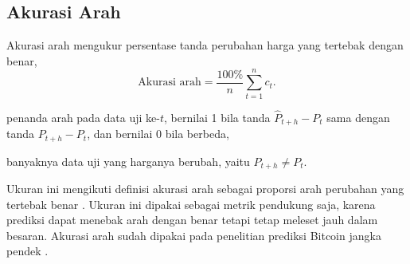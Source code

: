 \subsection{Akurasi Arah}
Akurasi arah mengukur persentase tanda perubahan harga yang tertebak dengan
benar,
\begin{equation}
  \text{Akurasi arah} = \frac{100\%}{n}\sum_{t=1}^{n} c_t .
  \label{eq:arah}
\end{equation}
\begin{keterangan}
  \item[$c_t$] penanda arah pada data uji ke-$t$, bernilai 1 bila tanda
    $\hat{P}_{t+h} - P_t$ sama dengan tanda $P_{t+h} - P_t$, dan bernilai 0
    bila berbeda,
  \item[$n$] banyaknya data uji yang harganya berubah, yaitu
    $P_{t+h} \neq P_t$.
\end{keterangan}
Ukuran ini mengikuti definisi akurasi arah sebagai proporsi arah perubahan
yang tertebak benar \cite{pesaran1992}.
Ukuran ini dipakai sebagai metrik pendukung saja, karena prediksi dapat menebak
arah dengan benar tetapi tetap meleset jauh dalam besaran. Akurasi arah sudah
dipakai pada penelitian prediksi Bitcoin jangka pendek
\cite{jaquart2021}.


